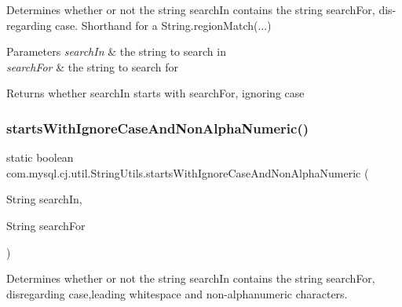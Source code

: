 Determines whether or not the string \textquotesingle{}search\+In\textquotesingle{} contains the string \textquotesingle{}search\+For\textquotesingle{}, dis-\/regarding case. Shorthand for a String.\+region\+Match(...)


\begin{DoxyParams}{Parameters}
{\em search\+In} & the string to search in \\
\hline
{\em search\+For} & the string to search for\\
\hline
\end{DoxyParams}
\begin{DoxyReturn}{Returns}
whether search\+In starts with search\+For, ignoring case 
\end{DoxyReturn}
\mbox{\label{classcom_1_1mysql_1_1cj_1_1util_1_1_string_utils_a0d5a764ceb465c096e7b2b24d444e773}} 
\subsubsection{\texorpdfstring{starts\+With\+Ignore\+Case\+And\+Non\+Alpha\+Numeric()}{startsWithIgnoreCaseAndNonAlphaNumeric()}}
{\footnotesize\ttfamily static boolean com.\+mysql.\+cj.\+util.\+String\+Utils.\+starts\+With\+Ignore\+Case\+And\+Non\+Alpha\+Numeric (\begin{DoxyParamCaption}\item[{String}]{search\+In,  }\item[{String}]{search\+For }\end{DoxyParamCaption})\hspace{0.3cm}{\ttfamily [static]}}

Determines whether or not the string \textquotesingle{}search\+In\textquotesingle{} contains the string \textquotesingle{}search\+For\textquotesingle{}, disregarding case,leading whitespace and non-\/alphanumeric characters.


